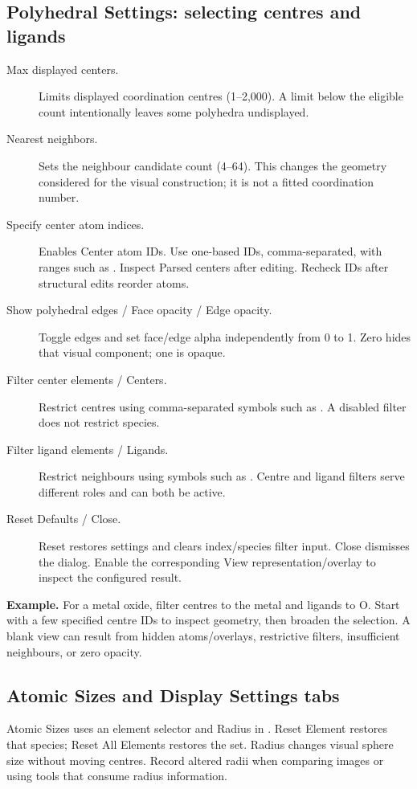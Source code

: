 \subsection{Polyhedral Settings: selecting centres and ligands}
\begin{description}
\item[Max displayed centers.] Limits displayed coordination centres (1--2,000). A limit below the eligible count intentionally leaves some polyhedra undisplayed.
\item[Nearest neighbors.] Sets the neighbour candidate count (4--64). This changes the geometry considered for the visual construction; it is not a fitted coordination number.
\item[Specify center atom indices.] Enables Center atom IDs. Use one-based IDs, comma-separated, with ranges such as . Inspect Parsed centers after editing. Recheck IDs after structural edits reorder atoms.
\item[Show polyhedral edges / Face opacity / Edge opacity.] Toggle edges and set face/edge alpha independently from 0 to 1. Zero hides that visual component; one is opaque.
\item[Filter center elements / Centers.] Restrict centres using comma-separated symbols such as . A disabled filter does not restrict species.
\item[Filter ligand elements / Ligands.] Restrict neighbours using symbols such as . Centre and ligand filters serve different roles and can both be active.
\item[Reset Defaults / Close.] Reset restores settings and clears index/species filter input. Close dismisses the dialog. Enable the corresponding View representation/overlay to inspect the configured result.
\end{description}
\textbf{Example.} For a metal oxide, filter centres to the metal and ligands to O. Start with a few specified centre IDs to inspect geometry, then broaden the selection. A blank view can result from hidden atoms/overlays, restrictive filters, insufficient neighbours, or zero opacity.

\subsection{Atomic Sizes and Display Settings tabs}
Atomic Sizes uses an element selector and Radius in \angstrom. Reset Element restores that species; Reset All Elements restores the set. Radius changes visual sphere size without moving centres. Record altered radii when comparing images or using tools that consume radius information.

